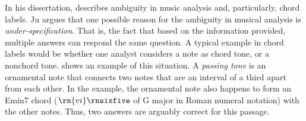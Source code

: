 

In his dissertation, \textcite{ju2021addressing} describes
ambiguity in music analysis and, particularly, chord labels.
Ju argues that one possible reason for the ambiguity in
musical analysis is \emph{under-specification}. That is, the
fact that based on the information provided, multiple
answers can respond the same question. A typical example in
chord labels would be whether one analyst considers a note
as chord tone, or a nonchord tone.  shows
an example of this situation. A \emph{passing tone} is an
ornamental note that connects two notes that are an interval
of a third apart from each other. In the example, the
ornamental note also happens to form an Emin7 chord
($\rn{vi}\rnsixfive$ of G major in Roman numeral notation)
with the other notes. Thus, two answers are arguably
correct for this passage.


